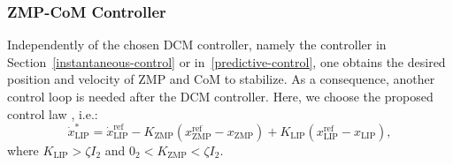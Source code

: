\subsubsection{ZMP-CoM Controller}
\label{ZMP-CoM-Controller}
Independently of the chosen DCM controller, namely the controller in Section~\ref{instantaneous-control} or in~\ref{predictive-control}, one obtains the desired position and velocity of ZMP and CoM to stabilize. As a consequence, another control loop is needed after the DCM controller. Here, we choose the proposed control law \citep{Choi2007}, i.e.:
\begin{equation}
\label{eq:ZMP_controller}
\dot{x}^*_{\text{LIP}} = \dot{x}^\text{ref}_{\text{LIP}} - K_\text{ZMP}(x_\text{ZMP}^\text{ref} - x_\text{ZMP}) + K_\text{LIP} (x^\text{ref}_{\text{LIP}} - x_{\text{LIP}}),
\end{equation}
where $K_\text{LIP} > \zeta I_2$  and $0_2 < K_\text{ZMP} < \zeta I_2$.